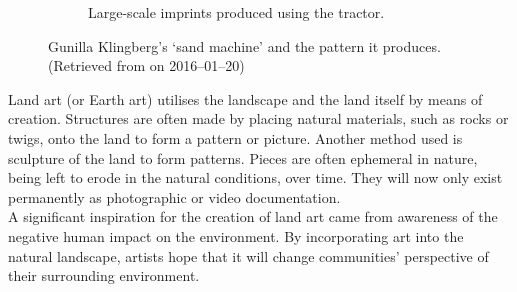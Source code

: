 \begin{figure}
\begin{subfigure}[b]{0.45\textwidth}
            \caption{Large-scale imprints produced using the tractor.}
            \label{fig: sand machine art}
        \end{subfigure}
        \caption{Gunilla Klingberg's `sand machine' and the pattern it produces. \small (Retrieved from      on 2016--01--20)}
        \label{fig: sand machine and art}
    \end{figure}
    Land art (or Earth art) utilises the landscape and the land itself by means of creation. Structures are often made by placing natural materials, such as rocks or twigs, onto the land to form a pattern or picture. Another method used is sculpture of the land to form patterns. Pieces are often ephemeral in nature, being left to erode in the natural conditions, over time. They will now only exist permanently as photographic or video documentation.\\
    A significant inspiration for the creation of land art came from awareness of the negative human impact on the environment. By incorporating art into the natural landscape, artists hope that it will change communities' perspective of their surrounding environment.

